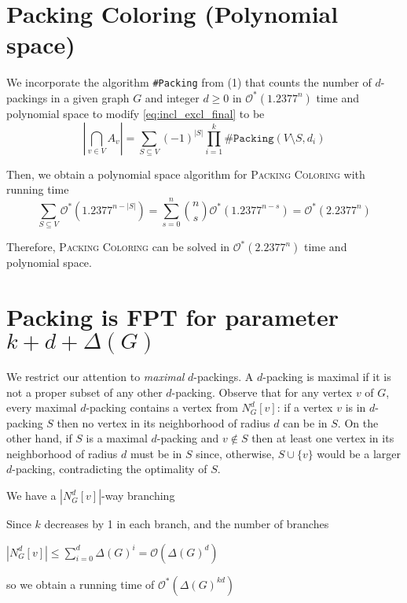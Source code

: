 \documentclass[10pt, a4paper]{article}
\theoremstyle{definition}
\newcommand{\mcO}{\mathcal{O}}
\begin{document}
\section{\sc Packing Coloring (\textnormal{Polynomial space})}

We incorporate the algorithm \texttt{\#Packing} from (1) that counts the number of $d$-packings in a given graph $G$ and integer $d \ge 0$ in $\mcO^*(1.2377^n)$ time and polynomial space to modify \cref{eq:incl_excl_final} to be
\begin{equation*}
	\left | \bigcap_{v \in V} A_v \right | 
	= \sum_{S \subseteq V} (-1)^{|S|} \prod_{i=1}^{k} \texttt{\#Packing}(V \setminus S, d_i)
\end{equation*}

Then, we obtain a polynomial space algorithm for \textsc{Packing Coloring} with running time
\begin{equation*}
	\sum_{S\subseteq V} \mcO^*(1.2377^{n-|S|}) = \sum_{s=0}^n \binom{n}{s} \mcO^*(1.2377^{n-s}) = \mcO^*(2.2377^n)
\end{equation*}

Therefore, \textsc{Packing Coloring} can be solved in $\mcO^*(2.2377^n)$ time and polynomial space.

\section{\sc Packing \textnormal{is FPT for parameter $k + d + \Delta (G)$} }

We restrict our attention to \emph{maximal} $d$-packings. A $d$-packing is maximal if it is not a proper subset of any other $d$-packing. Observe that for any vertex $v$ of $G$, every maximal $d$-packing contains a vertex from $N_G^d[v]$: if a vertex $v$ is in $d$-packing $S$ then no vertex in its neighborhood of radius $d$ can be in $S$. On the other hand, if $S$ is a maximal $d$-packing and $v \notin S$ then at least one vertex in its neighborhood of radius $d$ must be in $S$ since, otherwise, $S\cup \{ v \}$ would be a larger $d$-packing, contradicting the optimality of $S$.

We have a $|N_G^d[v]|$-way branching

Since $k$ decreases by 1 in each branch, and the number of branches

$|N_G^d[v]| \leq \sum_{i=0}^{d} \Delta(G)^i = \mcO(\Delta(G)^d)$ 

so we obtain a running time of $\mcO^{*}(\Delta(G)^{kd})$
\end{document}
